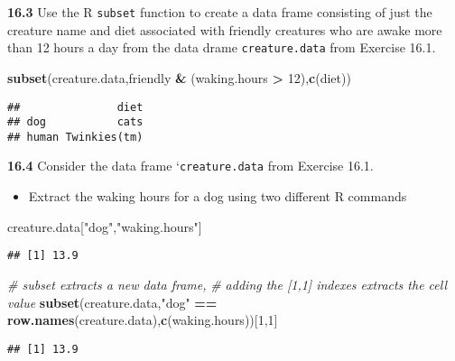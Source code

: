 \documentclass[]{article}
\newenvironment{Shaded}{\begin{snugshade}}{\end{snugshade}}
\newcommand{\KeywordTok}[1]{\textcolor[rgb]{0.13,0.29,0.53}{\textbf{#1}}}
\newcommand{\DecValTok}[1]{\textcolor[rgb]{0.00,0.00,0.81}{#1}}
\newcommand{\StringTok}[1]{\textcolor[rgb]{0.31,0.60,0.02}{#1}}
\newcommand{\CommentTok}[1]{\textcolor[rgb]{0.56,0.35,0.01}{\textit{#1}}}
\newcommand{\OperatorTok}[1]{\textcolor[rgb]{0.81,0.36,0.00}{\textbf{#1}}}
\newcommand{\NormalTok}[1]{#1}
\providecommand{\tightlist}{%
  \setlength{\itemsep}{0pt}\setlength{\parskip}{0pt}}
\begin{document}
\textbf{16.3} Use the R \texttt{subset} function to create a data frame
consisting of just the creature name and diet associated with friendly
creatures who are awake more than 12 hours a day from the data drame
\texttt{creature.data} from Exercise 16.1.

\begin{Shaded}
\begin{Highlighting}[]
\KeywordTok{subset}\NormalTok{(creature.data,friendly }\OperatorTok{&}\StringTok{ }\NormalTok{(waking.hours }\OperatorTok{>}\StringTok{ }\DecValTok{12}\NormalTok{),}\KeywordTok{c}\NormalTok{(diet))}
\end{Highlighting}
\end{Shaded}

\begin{verbatim}
##               diet
## dog           cats
## human Twinkies(tm)
\end{verbatim}

\textbf{16.4} Consider the data frame `\texttt{creature.data} from
Exercise 16.1.

\begin{itemize}
\tightlist
\item
  Extract the waking hours for a dog using two different R commands
\end{itemize}

\begin{Shaded}
\begin{Highlighting}[]
\NormalTok{creature.data[}\StringTok{"dog"}\NormalTok{,}\StringTok{"waking.hours"}\NormalTok{]}
\end{Highlighting}
\end{Shaded}

\begin{verbatim}
## [1] 13.9
\end{verbatim}

\begin{Shaded}
\begin{Highlighting}[]
\CommentTok{# subset extracts a new data frame,}
\CommentTok{# adding the [1,1] indexes extracts the cell value}
\KeywordTok{subset}\NormalTok{(creature.data,}\StringTok{"dog"} \OperatorTok{==}\StringTok{ }\KeywordTok{row.names}\NormalTok{(creature.data),}\KeywordTok{c}\NormalTok{(waking.hours))[}\DecValTok{1}\NormalTok{,}\DecValTok{1}\NormalTok{]}
\end{Highlighting}
\end{Shaded}

\begin{verbatim}
## [1] 13.9
\end{verbatim}
\end{document}
